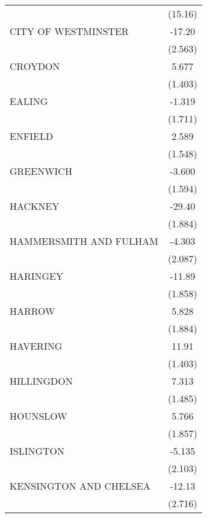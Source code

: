 {\begin{longtable}{l*{1}{c}}
                    &     (15.16)         \\
\addlinespace
CITY OF WESTMINSTER &      -17.20\sym{***}\\
                    &     (2.563)         \\
\addlinespace
CROYDON             &       5.677\sym{***}\\
                    &     (1.403)         \\
\addlinespace
EALING              &      -1.319         \\
                    &     (1.711)         \\
\addlinespace
ENFIELD             &       2.589         \\
                    &     (1.548)         \\
\addlinespace
GREENWICH           &      -3.600\sym{*}  \\
                    &     (1.594)         \\
\addlinespace
HACKNEY             &      -29.40\sym{***}\\
                    &     (1.884)         \\
\addlinespace
HAMMERSMITH AND FULHAM&      -4.303\sym{*}  \\
                    &     (2.087)         \\
\addlinespace
HARINGEY            &      -11.89\sym{***}\\
                    &     (1.858)         \\
\addlinespace
HARROW              &       5.828\sym{**} \\
                    &     (1.884)         \\
\addlinespace
HAVERING            &       11.91\sym{***}\\
                    &     (1.403)         \\
\addlinespace
HILLINGDON          &       7.313\sym{***}\\
                    &     (1.485)         \\
\addlinespace
HOUNSLOW            &       5.766\sym{**} \\
                    &     (1.857)         \\
\addlinespace
ISLINGTON           &      -5.135\sym{*}  \\
                    &     (2.103)         \\
\addlinespace
KENSINGTON AND CHELSEA&      -12.13\sym{***}\\
                    &     (2.716)         \\

\end{longtable}}
